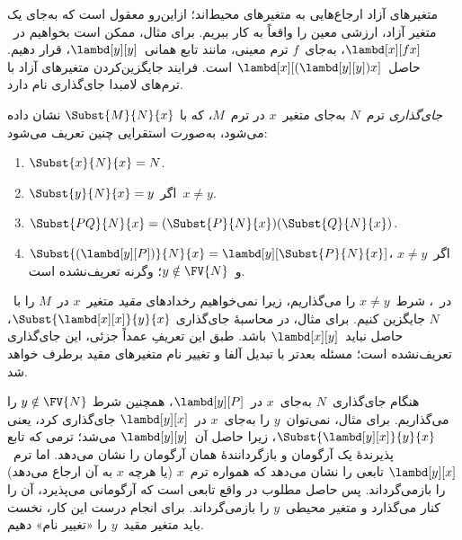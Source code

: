 \documentclass[../../../include/open-logic-section]{subfiles}
\begin{document}

\begin{explain}
متغیرهای آزاد ارجاع‌هایی به متغیرهای محیط‌اند؛ ازاین‌رو معقول است که
به‌جای یک متغیر آزاد، ارزشی معین را واقعاً به کار ببریم. برای مثال،
ممکن است بخواهیم در~$\lambd[x][f x]$، به‌جای~$f$ ترم معینی، مانند تابع
همانی~$\lambd[y][y]$، قرار دهیم. حاصل~$\lambd[x][(\lambd[y][y]) x]$
است. فرایند جایگزین‌کردن متغیرهای آزاد با ترم‌های لامبدا
جای‌گذاری نام دارد.
\end{explain}

\begin{defn} 
  \emph{جای‌گذاری} ترم~$N$ به‌جای متغیر~$x$ در ترم~$M$، که با
  $\Subst{M}{N}{x}$ نشان داده می‌شود، به‌صورت استقرایی چنین تعریف می‌شود:
  \begin{enumerate}
    \item $\Subst{x}{N}{x} = N$.  
    \item $\Subst{y}{N}{x}  = y$ اگر~$x \neq y$.  
    \item $\Subst{PQ}{N}{x}  = (\Subst{P}{N}{x}) (\Subst{Q}{N}{x})$.
    \item $\Subst{(\lambd[y][P])}{N}{x} = \lambd[y][\Subst{P}{N}{x}]$،
      اگر~$x \neq y$ و~$y \notin \FV{N}$؛ وگرنه تعریف‌نشده است.
  \end{enumerate}
\end{defn}

\begin{explain}
در~، شرط~$x \neq y$
را می‌گذاریم، زیرا نمی‌خواهیم رخدادهای \emph{مقید} متغیر~$x$ در~$M$ را
با~$N$ جایگزین کنیم. برای مثال، در محاسبهٔ جای‌گذاری
$\Subst{\lambd[x][x]}{y}{x}$، حاصل نباید~$\lambd[x][y]$ باشد. طبق این
تعریفِ عمداً جزئی، این جای‌گذاری تعریف‌نشده است؛ مسئله بعدتر با تبدیل
آلفا و تغییر نام متغیرهای مقید برطرف خواهد شد.

هنگام جای‌گذاری~$N$ به‌جای~$x$ در~$\lambd[y][P]$، همچنین شرط
$y \notin \FV{N}$ را می‌گذاریم. برای مثال، نمی‌توان~$y$ را به‌جای~$x$
در~$\lambd[y][x]$ جای‌گذاری کرد، یعنی
$\Subst{\lambd[y][x]}{y}{x}$، زیرا حاصل آن~$\lambd[y][y]$ می‌شد؛ ترمی
که تابع پذیرندهٔ یک آرگومان و بازگردانندهٔ همان آرگومان را نشان می‌دهد.
اما ترم~$\lambd[y][x]$ تابعی را نشان می‌دهد که همواره ترم~$x$ (یا هرچه
$x$ به آن ارجاع می‌دهد) را بازمی‌گرداند. پس حاصل مطلوب در واقع تابعی
است که آرگومانی می‌پذیرد، آن را کنار می‌گذارد و متغیر محیطی~$y$ را
بازمی‌گرداند. برای انجام درست این کار، نخست باید متغیر مقید~$y$ را
«تغییر نام» دهیم.
\end{explain}
\end{document}
